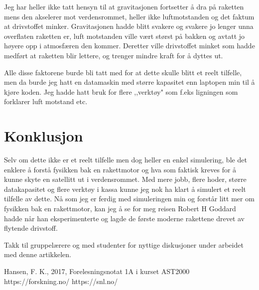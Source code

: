 \documentclass[12pt,preprint]{aastex6}
\begin{document}
Jeg har heller ikke tatt hensyn til at gravitasjonen fortsetter å dra på raketten mens den akselerer mot verdensrommet, heller ikke luftmotstanden og det faktum at drivstoffet minker. 
Gravitasjonen hadde blitt svakere og svakere jo lenger unna overflaten raketten er, luft motstanden ville vært størst på bakken og avtatt jo høyere opp i atmosfæren den kommer. Deretter ville drivstoffet minket som hadde medført at raketten blir lettere, og trenger mindre kraft for å dyttes ut. 

Alle disse faktorene burde bli tatt med for at dette skulle blitt et reelt tilfelle, men da burde jeg hatt en datamaskin med større kapasitet enn laptopen min til å kjøre koden. Jeg hadde hatt bruk for flere ,,verktøy" som f.eks ligningen som forklarer luft motstand etc. 

\section{Konklusjon}
Selv om dette ikke er et reelt tilfelle men dog heller en enkel simulering, ble det enklere å forstå fysikken bak en rakettmotor og hva som faktisk kreves for å kunne skyte en satellitt ut i verdensrommet. 
Med mere jobb, flere hoder, større datakapasitet og flere verktøy i kassa kunne jeg nok ha klart å simulert et reelt tilfelle av dette. 
Nå som jeg er ferdig med simuleringen min og forstår litt mer om fysikken bak en rakettmotor, kan jeg å se for meg reisen Robert H Goddard hadde når han eksperimenterte og lagde de første moderne rakettene drevet av flytende drivstoff. 
 



\begin{acknowledgments}
Takk til gruppelærere og med studenter for nyttige diskusjoner under arbeidet med denne artikkelen. 
\end{acknowledgments}




\begin{thebibliography}{}
 Hansen, F. K.,  2017, Forelesningsnotat 1A i kurset AST2000
https://forskning.no/
https://snl.no/
\end{thebibliography}
\end{document}
